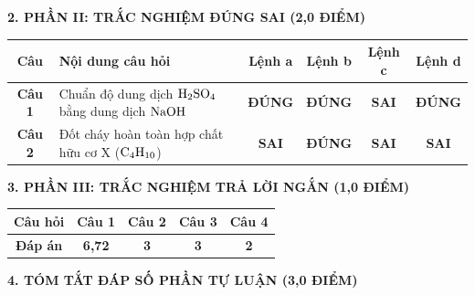 \documentclass[11pt,a4paper]{article}
\begin{document}
\vspace{4pt}
{\bfseries\color{mainGreen} 2. PHẦN II: TRẮC NGHIỆM ĐÚNG SAI (2,0 ĐIỂM)}

\vspace{2pt}
\begin{center}
\renewcommand{\arraystretch}{1.2}
\begin{tabular}{|c|p{7.5cm}|c|c|c|c|}
\hline
\rowcolor{tableGreen}
\textbf{Câu} & \textbf{Nội dung câu hỏi} & \textbf{Lệnh a} & \textbf{Lệnh b} & \textbf{Lệnh c} & \textbf{Lệnh d} \\ \hline
\textbf{Câu 1} & Chuẩn độ dung dịch $\ce{H2SO4}$ bằng dung dịch $\ce{NaOH}$ & \textbf{\color{hfRed}ĐÚNG} & \textbf{\color{hfRed}ĐÚNG} & \textbf{SAI} & \textbf{\color{hfRed}ĐÚNG} \\ \hline
\textbf{Câu 2} & Đốt cháy hoàn toàn hợp chất hữu cơ X ($\ce{C4H10}$) & \textbf{SAI} & \textbf{\color{hfRed}ĐÚNG} & \textbf{SAI} & \textbf{SAI} \\ \hline
\end{tabular}
\end{center}

\vspace{4pt}
{\bfseries\color{mainGreen} 3. PHẦN III: TRẮC NGHIỆM TRẢ LỜI NGẮN (1,0 ĐIỂM)}

\vspace{2pt}
\begin{center}
\renewcommand{\arraystretch}{1.2}
\begin{tabular}{|c|c|c|c|c|}
\hline
\rowcolor{tableGreen}
\textbf{Câu hỏi} & \textbf{Câu 1} & \textbf{Câu 2} & \textbf{Câu 3} & \textbf{Câu 4} \\ \hline
\textbf{Đáp án} & \textbf{\color{hfRed}6,72} & \textbf{\color{hfRed}3} & \textbf{\color{hfRed}3} & \textbf{\color{hfRed}2} \\ \hline
\end{tabular}
\end{center}

\vspace{4pt}
{\bfseries\color{mainGreen} 4. TÓM TẮT ĐÁP SỐ PHẦN TỰ LUẬN (3,0 ĐIỂM)}
\end{document}
